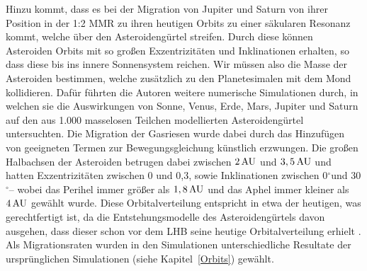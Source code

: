 \documentclass[12pt,a4paper,twoside,open=right,bibliography=totoc]{scrbook}
\renewcommand{\cite}{ \citep}
\newcommand{\refsec}[1]{siehe Kapitel~\ref{#1}}
\newcommand{\degree}{$^\circ$}
\begin{document}
Hinzu kommt, dass es bei der Migration von Jupiter und Saturn von ihrer Position in der 1:2 MMR zu ihren heutigen Orbits zu einer säkularen Resonanz kommt, welche über den Asteroidengürtel streifen.
Durch diese können Asteroiden Orbits mit so großen Exzentrizitäten und Inklinationen erhalten, so dass diese bis ins innere Sonnensystem reichen. Wir müssen also die Masse der Asteroiden bestimmen, welche zusätzlich zu den Planetesimalen mit dem Mond kollidieren.
Dafür führten die Autoren weitere numerische Simulationen durch, in welchen sie die Auswirkungen von Sonne, Venus, Erde, Mars, Jupiter und Saturn auf den aus 1.000 masselosen Teilchen modellierten Asteroidengürtel untersuchten.
Die Migration der Gasriesen wurde dabei durch das Hinzufügen von geeigneten Termen zur Bewegungsgleichung künstlich erzwungen.
Die großen Halbachsen der Asteroiden betrugen dabei zwischen $\unit[2]{AU}$ und $\unit[3,5]{AU}$ und hatten Exzentrizitäten zwischen 0 und 0,3, sowie Inklinationen zwischen 0\degree und 30\degree – wobei das Perihel immer größer als $\unit[1,8]{AU}$ und das Aphel immer kleiner als $\unit[4]{AU}$ gewählt wurde.
Diese Orbitalverteilung entspricht in etwa der heutigen, was gerechtfertigt ist, da die Entstehungsmodelle des Asteroidengürtels davon ausgehen, dass dieser schon vor dem LHB seine heutige Orbitalverteilung erhielt\cite{Wetherill1992,Petit2001,Gomes2005}.
Als Migrationsraten wurden in den Simulationen unterschiedliche Resultate der ursprünglichen Simulationen (\refsec{Orbits}) gewählt.
\end{document}
